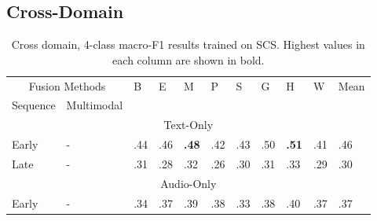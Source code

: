 \documentclass{article}
\begin{document}
\newpage
\subsection{Cross-Domain}\label{app:res-cd}

\begin{table}[H]
\centering
\caption{Cross domain, 4-class macro-F1 results trained on SCS. Highest values in each column are shown in bold.}
\begin{tabular}{|lllllllllll|}
\hline
\multicolumn{2}{|c|}{Fusion Methods}                                                      & \multirow{2}{*}{B} & \multirow{2}{*}{E} & \multirow{2}{*}{M} & \multirow{2}{*}{P} & \multirow{2}{*}{S} & \multirow{2}{*}{G} & \multirow{2}{*}{H} & \multicolumn{1}{l|}{\multirow{2}{*}{W}} & \multirow{2}{*}{Mean} \\ \cline{1-2}
\multicolumn{1}{|l|}{Sequence}               & \multicolumn{1}{l|}{Multimodal}    &                    &                    &                    &                    &                    &                    &                    & \multicolumn{1}{l|}{}                   &                       \\ \hline
\multicolumn{11}{|c|}{Text-Only}                                                                                                                                                                                                                                                                       \\ \hline
\multicolumn{1}{|l|}{Early}                  & \multicolumn{1}{l|}{-}             & .44                & .46                & \textbf{.48}       & .42                & .43                & .50                & \textbf{.51}       & \multicolumn{1}{l|}{.41}                & .46                   \\
\multicolumn{1}{|l|}{Late}                   & \multicolumn{1}{l|}{-}             & .31                & .28                & .32                & .26                & .30                & .31                & .33                & \multicolumn{1}{l|}{.29}                & .30                   \\ \hline
\multicolumn{11}{|c|}{Audio-Only}                                                                                                                                                                                                                                                                      \\ \hline
\multicolumn{1}{|l|}{Early}                  & \multicolumn{1}{l|}{-}             & .34                & .37                & .39                & .38                & .33                & .38                & .40                & \multicolumn{1}{l|}{.37}                & .37                   \\

\end{tabular}
\end{table}
\end{document}
